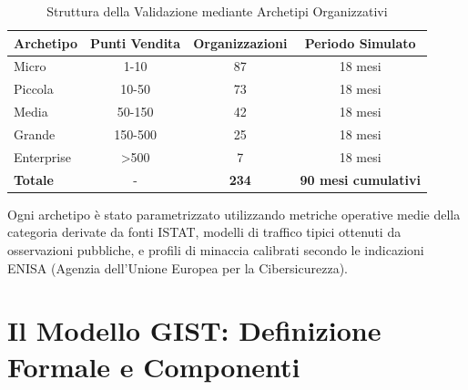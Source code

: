 \begin{table}[h!]
\centering
\caption{Struttura della Validazione mediante Archetipi Organizzativi}
\label{tab:archetype_validation}
\begin{tabular}{|l|c|c|c|}
\hline
\textbf{Archetipo} & \textbf{Punti Vendita} & \textbf{Organizzazioni} & \textbf{Periodo Simulato} \\
\hline
Micro & 1-10 & 87 & 18 mesi \\
Piccola & 10-50 & 73 & 18 mesi \\
Media & 50-150 & 42 & 18 mesi \\
Grande & 150-500 & 25 & 18 mesi \\
Enterprise & >500 & 7 & 18 mesi \\
\hline
\textbf{Totale} & - & \textbf{234} & \textbf{90 mesi cumulativi} \\
\hline
\end{tabular}
\end{table}

Ogni archetipo è stato parametrizzato utilizzando metriche operative medie della categoria derivate da fonti ISTAT, modelli di traffico tipici ottenuti da osservazioni pubbliche, e profili di minaccia calibrati secondo le indicazioni ENISA (Agenzia dell'Unione Europea per la Cibersicurezza).

\section{\texorpdfstring{Il Modello GIST: Definizione Formale e Componenti}{5.3 - Il Modello GIST: Definizione Formale e Componenti}}
\label{sec:5.3}

